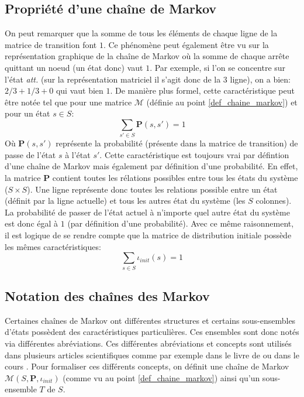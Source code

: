 \documentclass[letterpaper]{article}
\begin{document}
  \subsection{Propriété d'une chaîne de Markov}
    On peut remarquer que la somme de tous les éléments de chaque ligne de la
    matrice de transition font $1$.  Ce phénomène peut également être vu
    sur la représentation graphique de la chaîne de Markov où la somme de chaque
    arrête quittant un noeud (un état donc) vaut $1$.  Par exemple, si l'on se
    concentre sur l'état \textit{att.} (sur la représentation matriciel il s'agit donc 
    de la 3 ligne), on a bien: $2/3 + 1/3 + 0$ qui vaut bien $1$.  De manière 
    plus formel, cette caractéristique peut être notée tel que pour une matrice
    $\mathcal{M}$ (définie au point \ref{def_chaine_markov}) et pour un état $s \in S$:
    $$\sum\limits_{s' \in S} \mathbf{P}(s, s') = 1$$
    Où $\mathbf{P}(s, s')$ représente la probabilité (présente dans la matrice de
    transition) de passe de l'état $s$ à l'état $s'$.  Cette caractéristique est
    toujours vrai par défintion d'une chaîne de Markov mais également par définition
    d'une probabilité.
    En effet, la matrice $\mathbf{P}$ contient toutes les rélations possibles entre
    tous les états du système ($S \times S$).  Une ligne représente donc toutes les 
    relations possible entre un état (définit par la ligne actuelle) et tous les autres
    état du système (les $S$ colonnes).  La probabilité de passer de l'état actuel
    à n'importe quel autre état du système est donc égal à $1$ (par définition d'une probabilité).
    Avec ce même raisonnement, il est logique de se rendre compte que la matrice
    de distribution initiale possède les mêmes caractéristiques:
    $$\sum\limits_{s \in S} \iota_{init}(s) = 1$$
    
  \subsection{Notation des chaînes des Markov}
    Certaines chaînes de Markov ont différentes structures et certains
    sous-ensembles d'états possèdent des caractéristiques particulières.
    Ces ensembles sont donc notés via différentes abréviations.  Ces différentes
    abréviations et concepts sont utilisés dans plusieurs articles scientifiques
    comme par exemple dans le livre de \citet{ModelChecking} ou dans le cours
    \citet{COURS}.  Pour formaliser ces différents concepts, on définit 
    une chaîne de Markov $\mathcal{M}(S, \mathbf{P}, \iota_{init})$ 
    (comme vu au point \ref{def_chaine_markov}) ainsi qu'un sous-ensemble $T$ de $S$.
    
\end{document}
